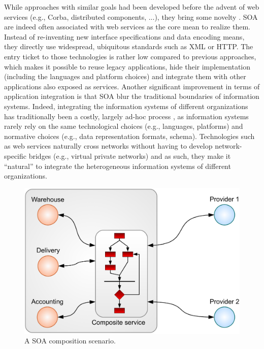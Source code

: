 While approaches with similar goals had been developed before the advent of web services (e.g., Corba, distributed components, ...), they bring some novelty \cite{Alonso04}. SOA are indeed often associated with web services as the core mean to realize them. Instead of re-inventing new interface specifications and data encoding means, they directly use widespread, ubiquitous standards such as XML or HTTP. The entry ticket to those technologies is rather low compared to previous approaches, which makes it possible to reuse legacy applications, hide their implementation (including the languages and platform choices) and integrate them with other applications also exposed as services. Another significant improvement in terms of application integration is that SOA blur the traditional boundaries of information systems. Indeed, integrating the information systems of different organizations has traditionally been a costly, largely ad-hoc process \cite{EAA02}, as information systems rarely rely on the same technological choices (e.g., languages, platforms) and normative choices (e.g., data representation formats, schema). Technologies such as web services naturally cross networks without having to develop network-specific bridges (e.g., virtual private networks) and as such, they make it ``natural'' to integrate the heterogeneous information systems of different organizations.\\

\begin{figure}[htbp]
    \centering
    \includegraphics[width=\textwidth]{content/web-services/soa-composition-scenario}
    \caption{A SOA composition scenario.}
    \label{fig:soa-composition-scenario}
\end{figure}

